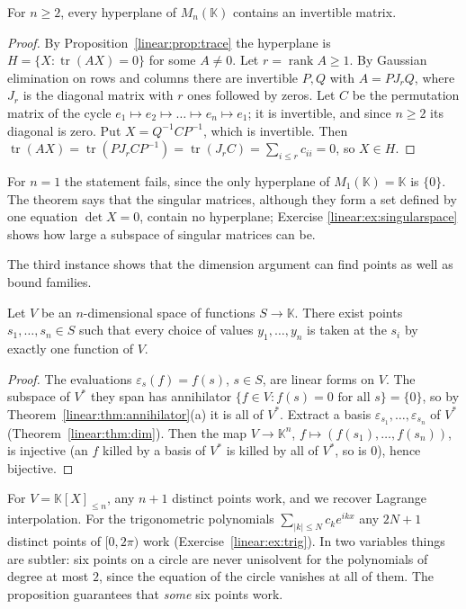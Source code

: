 \begin{theorem}\label{linear:thm:hyperplane}
For $n\ge2$, every hyperplane of $M_n(\mathbb K)$ contains an invertible matrix.
\end{theorem}
\begin{proof}
By Proposition~\ref{linear:prop:trace} the hyperplane is $H=\{X:\operatorname{tr}(AX)=0\}$ for some $A\ne0$. Let $r=\operatorname{rank}A\ge1$.
By Gaussian elimination on rows and columns there are invertible $P,Q$ with $A=PJ_rQ$, where $J_r$ is the diagonal matrix
with $r$ ones followed by zeros. Let $C$ be the permutation matrix of the cycle $e_1\mapsto e_2\mapsto\dots\mapsto e_n\mapsto
e_1$; it is invertible, and since $n\ge2$ its diagonal is zero. Put $X=Q^{-1}CP^{-1}$, which is invertible. Then
$\operatorname{tr}(AX)=\operatorname{tr}(PJ_rCP^{-1})=\operatorname{tr}(J_rC)=\sum_{i\le r}c_{ii}=0$, so $X\in H$.
\end{proof}

For $n=1$ the statement fails, since the only hyperplane of $M_1(\mathbb K)=\mathbb K$ is $\{0\}$. The theorem says that
the singular matrices, although they form a set defined by one equation $\det X=0$, contain no hyperplane; Exercise
\ref{linear:ex:singularspace} shows how large a subspace of singular matrices can be.

The third instance shows that the dimension argument can find points as well as bound families.

\begin{proposition}\label{linear:prop:unisolvent}
Let $V$ be an $n$-dimensional space of functions $S\to\mathbb K$. There exist points $s_1,\dots,s_n\in S$ such that every
choice of values $y_1,\dots,y_n$ is taken at the $s_i$ by exactly one function of $V$.
\end{proposition}
\begin{proof}
The evaluations $\varepsilon_s(f)=f(s)$, $s\in S$, are linear forms on $V$. The subspace of $V^*$ they span has annihilator
$\{f\in V:f(s)=0\text{ for all }s\}=\{0\}$, so by Theorem~\ref{linear:thm:annihilator}(a) it is all of $V^*$. Extract a basis
$\varepsilon_{s_1},\dots,\varepsilon_{s_n}$ of $V^*$ (Theorem~\ref{linear:thm:dim}). Then the map $V\to\mathbb K^n$,
$f\mapsto(f(s_1),\dots,f(s_n))$, is injective (an $f$ killed by a basis of $V^*$ is killed by all of $V^*$, so is $0$),
hence bijective.
\end{proof}

For $V=\mathbb K[X]_{\le n}$, any $n+1$ distinct points work, and we recover Lagrange interpolation. For the trigonometric
polynomials $\sum_{|k|\le N}c_ke^{ikx}$ any $2N+1$ distinct points of $[0,2\pi)$ work (Exercise~\ref{linear:ex:trig}). In two
variables things are subtler: six points on a circle are never unisolvent for the polynomials of degree at most $2$,
since the equation of the circle vanishes at all of them. The proposition guarantees that \emph{some} six points work.

